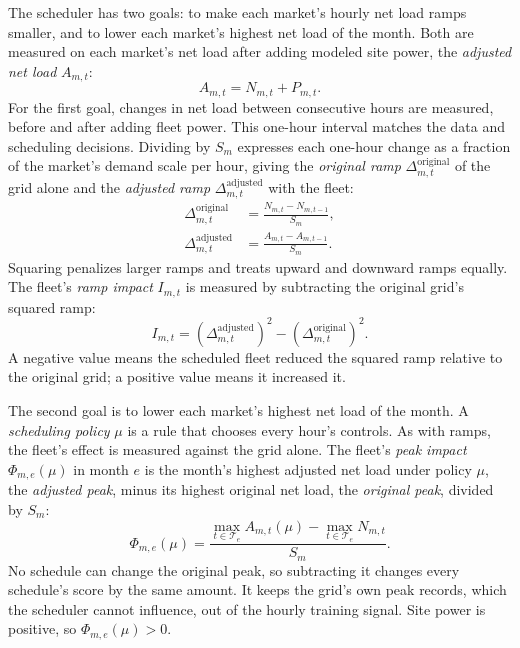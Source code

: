 \documentclass{UNCC-thesis}
\begin{document}
The scheduler has two goals: to make each market's hourly net load ramps smaller, and to lower each market's highest net
load of the month. Both are measured on each market's net load after adding
modeled site power, the \emph{adjusted net load} \(A_{m,t}\):
\begin{equation}
  A_{m,t}
  =
  N_{m,t}+P_{m,t}.
  \label{eq:adjusted-net-load}
\end{equation}
For the first goal, changes in net load between consecutive hours are measured, before and after
adding fleet power. This one-hour interval matches the data and scheduling
decisions. Dividing by \(S_m\) expresses each one-hour change as a fraction
of the market's demand scale per hour, giving the \emph{original ramp}
\(\Delta^{\mathrm{original}}_{m,t}\) of the grid alone and the \emph{adjusted
ramp} \(\Delta^{\mathrm{adjusted}}_{m,t}\) with the fleet:
\begin{align}
  \Delta^{\mathrm{original}}_{m,t}
  &=
  \frac{N_{m,t}-N_{m,t-1}}{S_m},
  \label{eq:native-ramp}\\
  \Delta^{\mathrm{adjusted}}_{m,t}
  &=
  \frac{A_{m,t}-A_{m,t-1}}{S_m}.
  \label{eq:adjusted-ramp}
\end{align}
Squaring penalizes larger ramps and treats upward and downward ramps
equally. The fleet's \emph{ramp impact} \(I_{m,t}\) is measured by
subtracting the original grid's squared ramp:
\begin{equation}
  I_{m,t}
  =
  \left(\Delta^{\mathrm{adjusted}}_{m,t}\right)^2
  -
  \left(\Delta^{\mathrm{original}}_{m,t}\right)^2.
  \label{eq:incremental-impact}
\end{equation}
A negative value means the scheduled fleet reduced the squared ramp relative
to the original grid; a positive value means it increased it.

The second goal is to lower each market's highest net load of the month. A
\emph{scheduling policy} \(\mu\) is a rule that chooses every hour's
controls. As with ramps, the fleet's effect is measured against the grid
alone. The fleet's \emph{peak impact} \(\Phi_{m,e}(\mu)\) in month \(e\) is
the month's highest adjusted net load under policy \(\mu\), the
\emph{adjusted peak}, minus its highest original net load, the
\emph{original peak}, divided by \(S_m\):
\begin{equation}
  \Phi_{m,e}(\mu)
  =
  \frac{\displaystyle\max_{t\in\mathcal T_e} A_{m,t}(\mu)
        -\max_{t\in\mathcal T_e} N_{m,t}}{S_m}.
  \label{eq:peak-impact}
\end{equation}
No schedule can change the original peak, so subtracting it changes every
schedule's score by the same amount. It keeps the grid's own peak records,
which the scheduler cannot influence, out of the hourly training signal.
Site power is positive, so \(\Phi_{m,e}(\mu)>0\).
\end{document}
